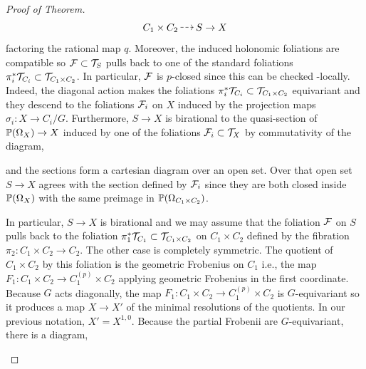 \documentclass[main.tex]{subfiles}
\begin{document}
\begin{proof}[Proof of Theorem]
\[ C_1 \times C_2 \rat S \to X \]
factoring the rational map $q$. Moreover, the induced holonomic foliations are compatible so $\F \subset \T_S$ pulls back to one of the standard foliations $\pi_i^* \T_{C_i} \subset \T_{C_1 \times C_2}$. In particular, $\F$ is $p$-closed since this can be checked \etale-locally. Indeed, the diagonal action makes the foliations $\pi_i^* \T_{C_i} \subset \T_{C_1 \times C_2}$ equivariant and they descend to the foliations $\F_i$ on $X$ induced by the projection maps $\sigma_i : X \to C_i / G$. Furthermore, $S \to X$ is birational to the quasi-section of $\P(\Omega_X) \to X$ induced by one of the foliations $\F_i \subset \T_X$ by commutativity of the diagram,
\begin{center}
\end{center}
and the sections form a cartesian diagram over an open set. Over that open set $S \to X$ agrees with the section defined by $\F_i$ since they are both closed inside $\P(\Omega_X)$ with the same preimage in $\P(\Omega_{C_1 \times C_2})$. 
\par 
In particular, $S \to X$ is birational and we may assume that the foliation $\F$ on $S$ pulls back to the foliation $\pi_1^* \T_{C_1} \subset \T_{C_1 \times C_2}$ on $C_1 \times C_2$ defined by the fibration $\pi_2 : C_1 \times C_2 \to C_2$. The other case is completely symmetric. The quotient of $C_1 \times C_2$ by this foliation is the geometric Frobenius on $C_1$ i.e., the map $F_1 : C_1 \times C_2 \to C_1^{(p)} \times C_2$ applying geometric Frobenius in the first coordinate. Because $G$ acts diagonally, the map $F_1 : C_1 \times C_2 \to C_1^{(p)} \times C_2$ is $G$-equivariant so it produces a map $X \to X'$ of the minimal resolutions of the quotients. In our previous notation, $X' = X^{1,0}$. Because the partial Frobenii are $G$-equivariant, there is a diagram,
\begin{center}
\end{center}
\end{proof}
\end{document}
